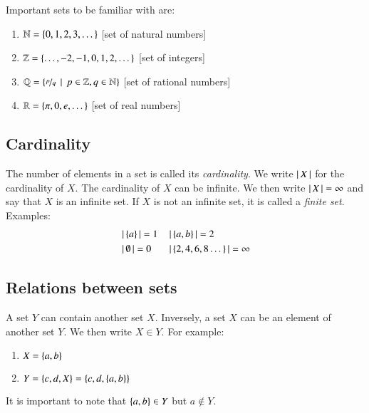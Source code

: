 \documentclass[nobib,nofonts]{tufte-handout}
\newcommand{\mygray}[1]{\textcolor{mygray2}{#1}}
\begin{document}
Important sets to be familiar with are:
\begin{enumerate}[]
\item $\mathbb{N} = \left\{0, 1,2,3, \dots\right\}$ \hfill \mygray{[set of natural numbers]}
\item $\mathbb{Z} = \left\{\dots, -2, -1, 0, 1, 2, \dots\right\}$ \hfill \mygray{[set of integers]}
\item $\mathbb{Q} = \left\{\nicefrac{p}{q} \thinspace \mid \thinspace p \in \mathbb{Z}, q \in \mathbb{N}\right\}$ \hfill \mygray{[set of rational
    numbers]}
\item $\mathbb{R} = \left\{\pi, 0, e, \dots\right\}$ \hfill \mygray{[set of real numbers]}
\end{enumerate}

\subsection{Cardinality}

The number of elements in a set is called its \emph{cardinality}.
We write $\left \lvert \, X \, \right\rvert$ for the cardinality of $X$. The cardinality of $X$ can be infinite.
We then write $\left \lvert \, X \, \right\rvert = \infty$ and say that $X$ is an infinite set.
If $X$ is not an infinite set, it is called a \emph{finite set}.
Examples:
\begin{align*}
  &\left \lvert \, \left\{a\right\} \, \right\rvert = 1 && \left \lvert \, \left\{a,b\right\} \, \right\rvert = 2 \\
  & \left \lvert \, \emptyset \, \right\rvert = 0    && \left \lvert \, \left\{2,4,6,8 \dots\right\} \, \right\rvert = \infty
\end{align*}

\subsection{Relations between sets}

A set $Y$ can contain another set $X$. Inversely, a set $X$ can be an element of another set
$Y$. We then write $X \in Y$. For example:
\begin{enumerate}[]
  \item $X = \left\{a,b\right\}$ 
  \item $Y = \left\{c, d, X\right\} = \left\{c, d, \left\{a,b\right\}\right\}$
\end{enumerate}
It is important to note that $\left\{a,b\right\} \in Y$ but $a \not \in Y$. 
\end{document}
